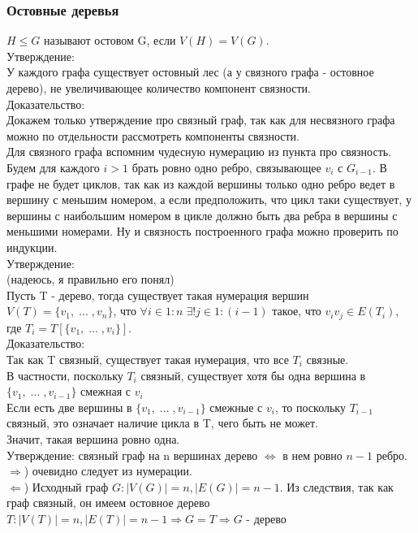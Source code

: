 \subsubsection{Остовные деревья}
$H \leq G$ называют остовом G, если $V(H) = V(G)$.\\
Утверждение:\\
У каждого графа существует остовный лес (а у связного графа - остовное дерево), не увеличивающее количество компонент связности.\\
Доказательство:\\
Докажем только утверждение про связный граф, так как для несвязного графа можно по отдельности рассмотреть компоненты связности.\\
Для связного графа вспомним чудесную нумерацию из пункта про связность. Будем для каждого $i > 1$ брать ровно одно ребро, связывающее $v_i$ с $G_{i - 1}$. В графе не будет циклов, так как из каждой вершины только одно ребро ведет в вершину с меньшим номером, а если предположить, что цикл таки существует, у вершины с наибольшим номером в цикле должно быть два ребра в вершины с меньшими номерами. Ну и связность построенного графа можно проверить по индукции.\\
Утверждение:\\
(надеюсь, я правильно его понял)\\
Пусть T - дерево, тогда существует такая нумерация вершин $V(T) = \{v_1, \; ... \; , v_n\}$, что $\forall i \in 1:n \; \exists! j \in 1:(i - 1)$ такое, что $v_iv_j \in E(T_i)$, где $T_i = T[\{v_1, \; ... \; , v_i\}]$.\\
Доказательство:\\
Так как T связный, существует такая нумерация, что все $T_i$ связные.\\
В частности, поскольку $T_i$ связный, существует хотя бы одна вершина в $\{v_1, \; ... \; , v_{i - 1}\}$ смежная с $v_i$\\
Если есть две вершины в $\{v_1, \; ... \; , v_{i - 1}\}$ смежные с $v_i$, то поскольку $T_{i - 1}$ связный, это означает наличие цикла в T, чего быть не может.\\
Значит, такая вершина ровно одна.\\
Утверждение: связный граф на n вершинах дерево $\Leftrightarrow$ в нем ровно $n - 1$ ребро.\\
$\Rightarrow$) очевидно следует из нумерации.\\
$\Leftarrow$) Исходный граф $G: |V(G)| = n, |E(G)| = n - 1$. Из следствия, так как граф связный, он имеем остовное дерево $T: |V(T)| = n, |E(T)| = n - 1 \Rightarrow G = T \Rightarrow G$ - дерево\\
